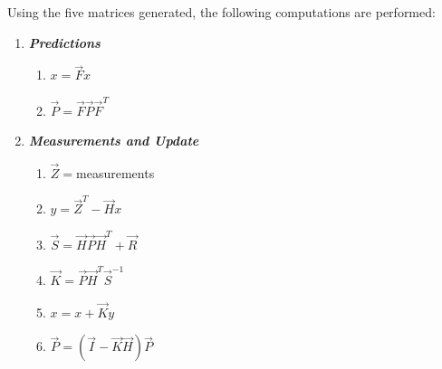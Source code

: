 Using the five matrices generated, the following computations are performed:
\begin{enumerate}
	\item \textbf{\textit{Predictions}}
	\begin{enumerate}
		\item $x = \vec{F} x$
		\item $\vec{P} = \vec{F}\vec{P}\vec{F}^{T} $
	\end{enumerate}
	\item \textbf{\textit{Measurements and Update}}
	\begin{enumerate}
		\item $\vec{Z} = $measurements
		\item $y = \vec{Z}^{T} - \vec{H}x$
		\item $\vec{S} = \vec{H}\vec{P}\vec{H}^{T} + \vec{R}$
		\item $\vec{K} = \vec{P}\vec{H}^{T}\vec{S}^{-1}$
		\item $x = x + \vec{K}y$
		\item $\vec{P} = (\vec{I} - \vec{K}\vec{H})\vec{P}$
	\end{enumerate}
\end{enumerate} 








